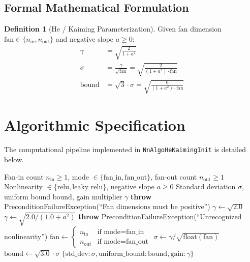 \documentclass[11pt,a4paper]{article}
\theoremstyle{definition}
\newtheorem{definition}{Definition}[section]
\begin{document}
\subsection{Formal Mathematical Formulation}
\begin{definition}[He / Kaiming Parameterization]
Given fan dimension $\text{fan} \in \{n_{\text{in}}, n_{\text{out}}\}$ and negative slope $a \ge 0$:
\begin{align}
\gamma &= \sqrt{\frac{2}{1 + a^2}} \label{eq:kaiming_gain} \\
\sigma &= \frac{\gamma}{\sqrt{\text{fan}}} = \sqrt{\frac{2}{(1 + a^2) \cdot \text{fan}}} \label{eq:kaiming_sigma} \\
\text{bound} &= \sqrt{3} \cdot \sigma = \sqrt{\frac{6}{(1 + a^2) \cdot \text{fan}}} \label{eq:kaiming_bound}
\end{align}
\end{definition}

\section{Algorithmic Specification}

The computational pipeline implemented in \texttt{NnAlgoHeKaimingInit} is detailed below.

\begin{algorithm}[H]
\caption{He (Kaiming) Initialization Computation}
\begin{algorithmic}[1]
\Require Fan-in count $n_{\text{in}} \ge 1$, mode $\in \{\text{fan\_in}, \text{fan\_out}\}$, fan-out count $n_{\text{out}} \ge 1$
\Require Nonlinearity $\in \{\text{relu}, \text{leaky\_relu}\}$, negative slope $a \ge 0$
\Ensure Standard deviation $\sigma$, uniform bound $\text{bound}$, gain multiplier $\gamma$
    \State \textbf{throw} PreconditionFailureException(``Fan dimensions must be positive'')
\EndIf
{}
    \State $\gamma \gets \sqrt{2.0}$
    \State $\gamma \gets \sqrt{2.0 / (1.0 + a^2)}$
\Else
    \State \textbf{throw} PreconditionFailureException(``Unrecognized nonlinearity'')
\EndIf
\State $\text{fan} \gets \begin{cases} n_{\text{in}} & \text{if } \text{mode} = \text{fan\_in} \\ n_{\text{out}} & \text{if } \text{mode} = \text{fan\_out} \end{cases}$
\State $\sigma \gets \gamma / \sqrt{\text{float}(\text{fan})}$
\State $\text{bound} \gets \sqrt{3.0} \cdot \sigma$
\State \Return $\{\text{std\_dev}: \sigma, \text{uniform\_bound}: \text{bound}, \text{gain}: \gamma\}$
\end{algorithmic}
\end{algorithm}
\end{document}
